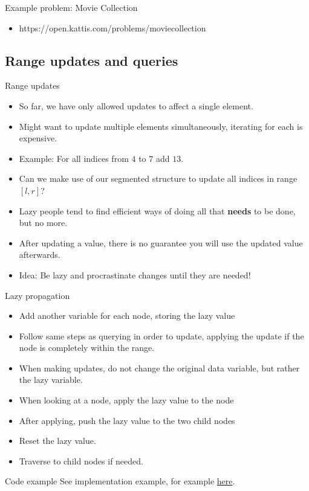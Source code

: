 \documentclass{beamer}
\begin{document}
\begin{frame}[plain]{Example problem: Movie Collection}
    \begin{itemize}
        \item https://open.kattis.com/problems/moviecollection
    \end{itemize}
\end{frame}

\subsection*{Range updates and queries}

\begin{frame}[plain]{Range updates}
    \begin{itemize}
        \item<1-> So far, we have only allowed updates to affect a single element.
        \item<2-> Might want to update multiple elements simultaneously, iterating for each is expensive.
        \item<3-> Example: For all indices from $4$ to $7$ add $13$.
        \item<4-> Can we make use of our segmented structure to update all indices in range $[l, r]$?
        \item<5-> Lazy people tend to find efficient ways of doing all that \textbf{needs} to be done, but no more.
        \item<6-> After updating a value, there is no guarantee you will use the updated value afterwards.
        \item<7-> Idea: Be lazy and procrastinate changes until they are needed!
    \end{itemize}
\end{frame}

\begin{frame}[plain]{Lazy propagation}
    \begin{itemize}
        \item<1-> Add another variable for each node, storing the lazy value
        \item<2-> Follow same steps as querying in order to update, applying the update if the node is completely within the range.
        \item<3-> When making updates, do not change the original data variable, but rather the lazy variable.
        \item<4-> When looking at a node, apply the lazy value to the node
        \item<5-> After applying, push the lazy value to the two child nodes
        \item<6-> Reset the lazy value.
        \item<7-> Traverse to child nodes if needed.
    \end{itemize}
\end{frame}

\begin{frame}[plain]{Code example}
    See implementation example, for example \href{https://github.com/keppnisforritun/aflv_slides/tree/main/datastructures/lazy_propagation_segment_tree.cpp}{here}.
\end{frame}
\end{document}
